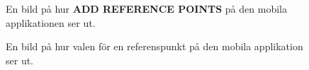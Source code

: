 \documentclass[a4paper,12pt]{article}
\begin{document}
 \begin{figure}[H]
   \centering
   \caption{En bild på hur \textbf{ADD REFERENCE POINTS} på den mobila applikationen ser ut.}
   \label{fig:mob_scan_ref}
 \end{figure}

 \begin{figure}[H]
   \centering
   \caption{En bild på hur valen för en referenspunkt på den mobila applikation ser ut.}
   \label{fig:mob_scan_ref_option}
 \end{figure}
\end{document}
